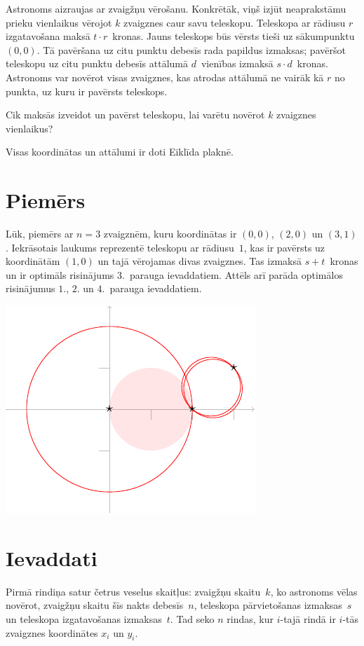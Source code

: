 

\noindent
Astronoms aizraujas ar zvaigžņu vērošanu.
Konkrētāk, viņš izjūt neaprakstāmu prieku vienlaikus vērojot $k$ zvaigznes caur savu teleskopu.
Teleskopa ar rādiusu $r$ izgatavošana maksā $t\cdot r$~kronas.
Jauns teleskops būs vērsts tieši uz sākumpunktu $(0,0)$.
Tā pavēršana uz citu punktu debesīs rada papildus izmaksas;
pavēršot teleskopu uz citu punktu debesīs attālumā $d$~vienības izmaksā $s\cdot d$~kronas.
Astronoms var novērot visas zvaigznes, kas atrodas attālumā ne vairāk kā $r$ no punkta, uz kuru ir pavērsts teleskops.

Cik maksās izveidot un pavērst teleskopu, lai varētu novērot $k$ zvaigznes vienlaikus?

\medskip

Visas koordinātas un attālumi ir doti Eiklīda plaknē.

\section*{Piemērs}

Lūk, piemērs ar $n=3$ zvaigznēm, kuru koordinātas ir $(0,0)$, $(2,0)$ un $(3,1)$.
Iekrāsotais laukums reprezentē teleskopu ar rādiusu~$1$, kas ir pavērsts uz koordinātām $(1,0)$ un
tajā vērojamas divas zvaigznes. Tas izmaksā $s + t$~kronas un ir optimāls risinājums $3$.~parauga ievaddatiem.
Attēls arī parāda optimālos risinājumus $1$., $2$. un $4$.~parauga ievaddatiem.

\medskip
\noindent
\includegraphics[width=.3\textwidth]{img/samples.pdf}

\section*{Ievaddati}

Pirmā rindiņa satur četrus veselus skaitļus:
zvaigžņu skaitu~$k$, ko astronoms vēlas novērot,
zvaigžņu skaitu šīs nakts debesīs~$n$,
teleskopa pārvietošanas izmaksas~$s$ un
teleskopa izgatavošanas izmaksas~$t$.
Tad seko $n$ rindas, kur $i$-tajā rindā ir $i$-tās zvaigznes koordinātes $x_i$ un $y_i$.

